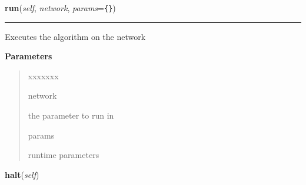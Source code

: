 \hspace{.8\funcindent}\begin{boxedminipage}{\funcwidth}

    \raggedright \textbf{run}(\textit{self}, \textit{network}, \textit{params}={\tt \texttt{\{}\texttt{\}}})

    \vspace{-1.5ex}

    \rule{\textwidth}{0.5\fboxrule}
\setlength{\parskip}{2ex}
    Executes the algorithm on the network

\setlength{\parskip}{1ex}
      \textbf{Parameters}
      \vspace{-1ex}

      \begin{quote}
        \begin{Ventry}{xxxxxxx}

          \item[network]

          the parameter to run in

          \item[params]

          runtime parameters

        \end{Ventry}

      \end{quote}

    \end{boxedminipage}

    \label{datk:core:distalgs:Algorithm:halt}

    \vspace{0.5ex}

\hspace{.8\funcindent}\begin{boxedminipage}{\funcwidth}

    \raggedright \textbf{halt}(\textit{self})

\setlength{\parskip}{2ex}
\setlength{\parskip}{1ex}
    \end{boxedminipage}

    \label{datk:core:distalgs:Algorithm:count_msg}

